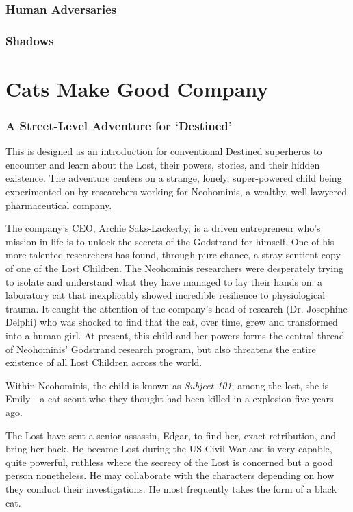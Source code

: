 \documentclass[letterpaper,serif]{rpg-module}
\begin{document}
\section{Human Adversaries}
\label{npcs_humans}

\section{Shadows}
\label{npcs_shadows}

\pagebreak

\part{Cats Make Good Company}
\label{cmgc}

\section{A Street-Level Adventure for `Destined'} 
\label{scenario ideas}

This is designed as an introduction for conventional Destined superheros to encounter and learn about the Lost, their powers, stories, and their hidden existence. The adventure centers on a strange, lonely, super-powered child being experimented on by researchers working for Neohominis, a wealthy, well-lawyered pharmaceutical company. 

The company's CEO, Archie Saks-Lackerby, is a driven entrepreneur who's mission in life is to unlock the secrets of the Godstrand for himself. One of his more talented researchers has found, through pure chance, a stray sentient copy of one of the Lost Children. The Neohominis researchers were desperately trying to isolate and understand what they have managed to lay their hands on: a laboratory cat that inexplicably showed incredible resilience to physiological trauma. It caught the attention of the company's head of research (Dr. Josephine Delphi) who was shocked to find that the cat, over time, grew and transformed into a human girl. At present, this child and her powers forms the central thread of Neohominis' Godstrand research program, but also threatens the entire existence of all Lost Children across the world. 

Within Neohominis, the child is known as \emph{Subject 101}; among the lost, she is Emily - a cat scout who they thought had been killed in a explosion five years ago. 

The Lost have sent a senior assassin, Edgar, to find her, exact retribution, and bring her back. He became Lost during the US Civil War and is very capable, quite powerful, ruthless where the secrecy of the Lost is concerned but a good person nonetheless. He may collaborate with the characters depending on how they conduct their investigations. He most frequently takes the form of a black cat.
\end{document}
